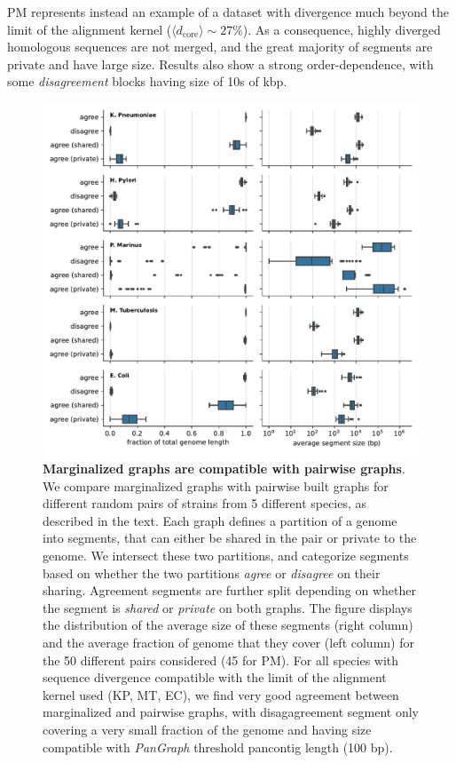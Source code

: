 \documentclass[aps,rmp,reprint,superscriptaddress,notitlepage,10pt,onecolumn]{revtex4-1}
\newcommand{\dcore}{\langle d_\text{core} \rangle}
\begin{document}
PM represents instead an example of a dataset with divergence much beyond the limit of the alignment kernel ($\dcore \sim 27 \%$). As a consequence, highly diverged homologous sequences are not merged, and the great majority of segments are private and have large size. Results also show a strong order-dependence, with some \textit{disagreement} blocks having size of 10s of kbp.


\begin{figure}[htb]
    \includegraphics[width=.9\textwidth]{figs_suppl/proj_fig.pdf}
    \caption{
        {\bf Marginalized graphs are compatible with pairwise graphs}.
        We compare marginalized graphs with pairwise built graphs for different random pairs of strains from 5 different species, as described in the text. Each graph defines a partition of a genome into segments, that can either be shared in the pair or private to the genome. We intersect these two partitions, and categorize segments based on whether the two partitions \textit{agree} or \textit{disagree} on their sharing. Agreement segments are further split depending on whether the segment is \textit{shared} or \textit{private} on both graphs. The figure displays the distribution of the average size of these segments (right column) and the average fraction of genome that they cover (left column) for the 50 different pairs considered (45 for PM).
        For all species with sequence divergence compatible with the limit of the alignment kernel used (KP, MT, EC), we find very good agreement between marginalized and pairwise graphs, with disagagreement segment only covering a very small fraction of the genome and having size compatible with \textit{PanGraph} threshold pancontig length (100 bp).
    }
    \label{fig:marginalize-suppl}
\end{figure}


\end{document}
